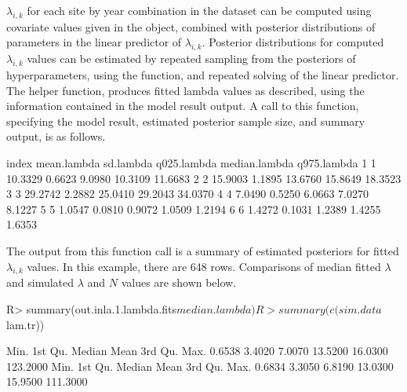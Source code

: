 \documentclass[codesnippet]{jss}
\begin{document}
$\lambda_{i,k}$ for each site by year combination in the dataset can be computed using covariate values given in the  object, combined with posterior distributions of parameters in the linear predictor of $\lambda_{i,k}$. Posterior distributions for computed $\lambda_{i,k}$ values can be estimated by repeated sampling from the posteriors of hyperparameters, using the  function, and repeated solving of the linear predictor. The helper function,  produces fitted lambda values as described, using the information contained in the model result output. A call to this function, specifying the model result, estimated posterior sample size, and summary output, is as follows.

\begin{CodeOutput}
  index mean.lambda sd.lambda  q025.lambda  median.lambda   q975.lambda
1     1     10.3329    0.6623       9.0980        10.3109       11.6683
2     2     15.9003    1.1895      13.6760        15.8649       18.3523
3     3     29.2742    2.2882      25.0410        29.2043       34.0370
4     4      7.0490    0.5250       6.0663         7.0270        8.1227
5     5      1.0547    0.0810       0.9072         1.0509        1.2194
6     6      1.4272    0.1031       1.2389         1.4255        1.6353
\end{CodeOutput}

The output from this function call is a summary of estimated posteriors for fitted $\lambda_{i,k}$ values. In this example, there are 648 rows. Comparisons of median fitted $\lambda$ and simulated $\lambda$ and $N$ values are shown below.

\begin{CodeInput}
R> summary(out.inla.1.lambda.fits$median.lambda)
R> summary(c(sim.data$lam.tr))
\end{CodeInput}
\begin{CodeOutput}
  Min.   1st Qu.    Median     Mean    3rd Qu.       Max. 
0.6538    3.4020    7.0070  13.5200    16.0300   123.2000
  Min.   1st Qu.    Median     Mean    3rd Qu.       Max. 
0.6834    3.3050    6.8190  13.0300    15.9500   111.3000 
\end{CodeOutput}
\end{document}

